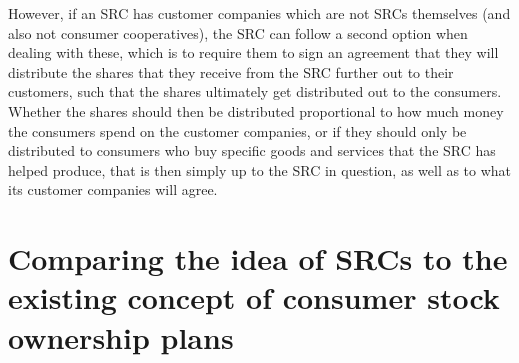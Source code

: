 \documentclass{article}
\begin{document}
However, if an SRC has customer companies which are not SRCs themselves (and also not consumer cooperatives), the SRC can follow a second option when dealing with these, %
which is to require them to sign an agreement that they will distribute the shares that they receive from the SRC further out to their customers, such that the shares ultimately get distributed out to the consumers. Whether the shares should then be distributed proportional to how much money the consumers spend on the customer companies, or if they should only be distributed to consumers who buy specific goods and services that the SRC has helped produce, that is then simply up to the SRC in question, as well as to what its customer companies will agree.







\section{Comparing the idea of SRCs to the existing concept of consumer stock ownership plans}

\end{document}

